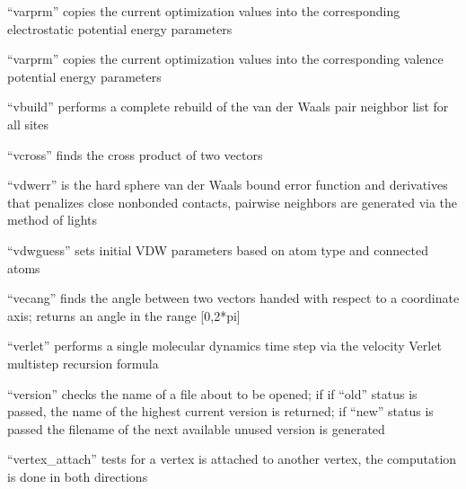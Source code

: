 \documentclass[letterpaper,11pt,english]{sphinxmanual}
\begin{document}
\sphinxAtStartPar
{}

\sphinxAtStartPar
“varprm” copies the current optimization values into the corresponding electrostatic potential energy parameters

\sphinxAtStartPar
{}

\sphinxAtStartPar
“varprm” copies the current optimization values into the corresponding valence potential energy parameters

\sphinxAtStartPar
{}

\sphinxAtStartPar
“vbuild” performs a complete rebuild of the van der Waals
pair neighbor list for all sites

\sphinxAtStartPar
{}

\sphinxAtStartPar
“vcross” finds the cross product of two vectors

\sphinxAtStartPar
{}

\sphinxAtStartPar
“vdwerr” is the hard sphere van der Waals bound error function and derivatives that penalizes close nonbonded contacts, pairwise neighbors are generated via the method of lights

\sphinxAtStartPar
{}

\sphinxAtStartPar
“vdwguess” sets initial VDW parameters based on atom type and connected atoms

\sphinxAtStartPar
{}

\sphinxAtStartPar
“vecang” finds the angle between two vectors handed with respect to a coordinate axis; returns an angle in the range {[}0,2*pi{]}

\sphinxAtStartPar
{}

\sphinxAtStartPar
“verlet” performs a single molecular dynamics time step via the velocity Verlet multistep recursion formula

\sphinxAtStartPar
{}

\sphinxAtStartPar
“version” checks the name of a file about to be opened; if if “old” status is passed, the name of the highest current version is returned; if “new” status is passed the filename of the next available unused version is generated

\sphinxAtStartPar
{}

\sphinxAtStartPar
“vertex\_attach” tests for a vertex is attached to another vertex, the computation is done in both directions
\end{document}
